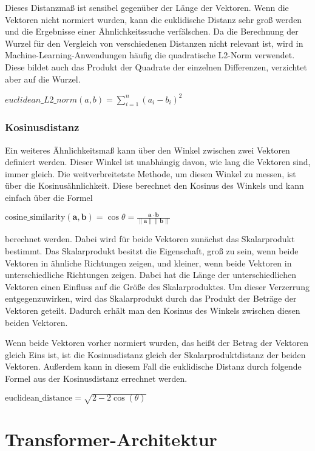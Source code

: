 Dieses Distanzmaß ist sensibel gegenüber der Länge der Vektoren.
Wenn die Vektoren nicht normiert wurden, kann die euklidische Distanz sehr groß werden und die Ergebnisse einer Ähnlichkeitssuche verfälschen.
Da die Berechnung der Wurzel für den Vergleich von verschiedenen Distanzen nicht relevant ist, wird in Machine-Learning-Anwendungen häufig die quadratische L2-Norm verwendet.
Diese bildet auch das Produkt der Quadrate der einzelnen Differenzen, verzichtet aber auf die Wurzel.~\cite{kryszkiewicz2013}

$euclidean\_L2\_norm(a,b) = \sum_{i=1}^{n} (a_i-b_i)^2$


\subsubsection{Kosinusdistanz}

Ein weiteres Ähnlichkeitsmaß kann über den Winkel zwischen zwei Vektoren definiert werden.
Dieser Winkel ist unabhängig davon, wie lang die Vektoren sind, immer gleich.
Die weitverbreitetste Methode, um diesen Winkel zu messen, ist über die Kosinusähnlichkeit.
Diese berechnet den Kosinus des Winkels und kann einfach über die Formel

$\text{cosine\_similarity}(\mathbf{a}, \mathbf{b}) = \cos{\theta} = \frac{\mathbf{a} \cdot \mathbf{b}}{\|\mathbf{a}\| \|\mathbf{b}\|}$

berechnet werden.
Dabei wird für beide Vektoren zunächst das Skalarprodukt bestimmt.
Das Skalarprodukt besitzt die Eigenschaft, groß zu sein, wenn beide Vektoren in ähnliche Richtungen zeigen, und kleiner, wenn beide Vektoren in unterschiedliche Richtungen zeigen.
Dabei hat die Länge der unterschiedlichen Vektoren einen Einfluss auf die Größe des Skalarproduktes.
Um dieser Verzerrung entgegenzuwirken, wird das Skalarprodukt durch das Produkt der Beträge der Vektoren geteilt.
Dadurch erhält man den Kosinus des Winkels zwischen diesen beiden Vektoren.

Wenn beide Vektoren vorher normiert wurden, das heißt der Betrag der Vektoren gleich Eins ist, ist die Kosinusdistanz gleich der Skalarproduktdistanz der beiden Vektoren.
Außerdem kann in diesem Fall die euklidische Distanz durch folgende Formel aus der Kosinusdistanz errechnet werden.~\cite{kryszkiewicz2013}

$\text{euclidean\_distance} = \sqrt{2 - 2 \cos(\theta)}$

\section{Transformer-Architektur}

